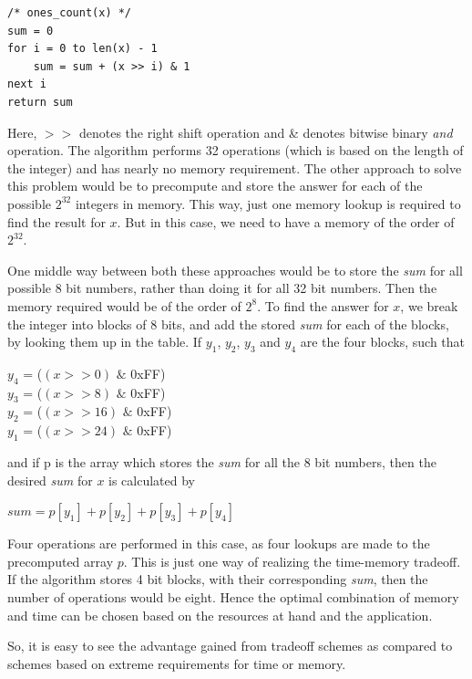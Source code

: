 \begin{lstlisting}[frame=tb]
/* ones_count(x) */
sum = 0
for i = 0 to len(x) - 1
    sum = sum + (x >> i) & 1
next i
return sum
\end{lstlisting}

Here, $>>$ denotes the right shift operation and \& denotes bitwise binary \emph{and} operation. The algorithm performs 32 operations (which is based on the length of the integer) and has nearly no memory requirement. The other approach to solve this problem would be to precompute and store the answer for each of the possible $2^{32}$ integers in memory. This way, just one memory lookup is required to find the result for $x$. But in this case, we need to have a memory of the order of $2^{32}$. 

One middle way between both these approaches would be to store the \textit{sum} for all possible 8 bit numbers, rather than doing it for all 32 bit numbers. Then the memory required would be of the order of $2^{8}$. To find the answer for $x$, we break the integer into blocks of 8 bits, and add the stored \textit{sum} for each of the blocks, by looking them up in the table. If $y_1$, $y_2$, $y_3$ and $y_4$ are the four blocks, such that

\begin{center}
$y_4$ = ($(x >> 0)$ $\&$ $0$xFF)\\
$y_3$ = ($(x >> 8)$ $\&$ $0$xFF)\\ 
$y_2$ = ($(x >> 16)$ $\&$ $0$xFF)\\ 
$y_1$ = ($(x >> 24)$ $\&$ $0$xFF)\\
\end{center}

and if p is the array which stores the \textit{sum} for all the 8 bit numbers, then the desired \textit{sum} for $x$ is calculated by

\begin{center}
$sum = p[y_1] + p[y_2] + p[y_3] + p[y_4]$\\
\end{center}

Four operations are performed in this case, as four lookups are made to the precomputed array $p$. This is just one way of realizing the time-memory tradeoff. If the algorithm stores 4 bit blocks, with their corresponding \textit{sum}, then the number of operations would be eight. Hence the optimal combination of memory and time can be chosen based on the resources at hand and the application. 

So, it is easy to see the advantage gained from tradeoff schemes as compared to schemes based on extreme requirements for time or memory. 

